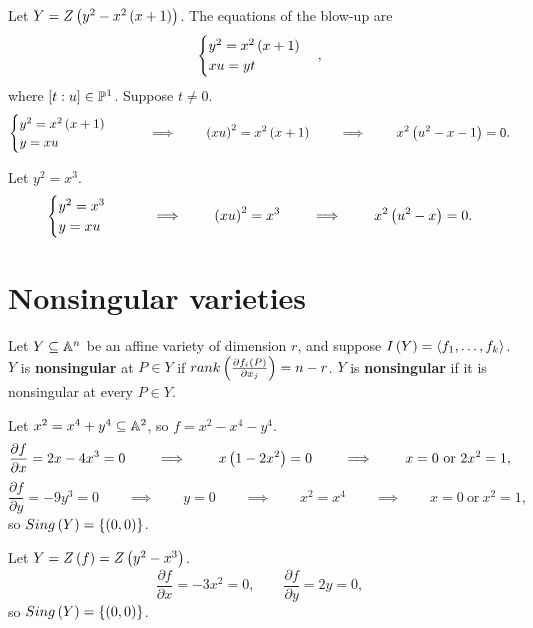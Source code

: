 \begin{example}
Let $ Y = Z\rb{y^2 - x^2\rb{x + 1}} $. The equations of the blow-up are
$$
\begin{cases}
y^2 = x^2\rb{x + 1} \\
xu = yt
\end{cases},
$$
where $ \sb{t : u} \in \P^1 $. Suppose $ t \ne 0 $.
$$
\begin{cases}
y^2 = x^2\rb{x + 1} \\
y = xu
\end{cases}
\qquad \implies \qquad \rb{xu}^2 = x^2\rb{x + 1} \qquad \implies \qquad x^2\rb{u^2 - x - 1} = 0.
$$
\end{example}

\begin{example}
Let $ y^2 = x^3 $.
$$
\begin{cases}
y^2 = x^3 \\
y = xu
\end{cases}
\qquad \implies \qquad \rb{xu}^2 = x^3 \qquad \implies \qquad x^2\rb{u^2 - x} = 0.
$$
\end{example}

\pagebreak

\section{Nonsingular varieties}


\begin{definition}
Let $ Y \subseteq \A^n $ be an affine variety of dimension $ r $, and suppose $ I\rb{Y} = \ab{f_1, \dots, f_k} $. $ Y $ is \textbf{nonsingular} at $ P \in Y $ if $ rank\rb{\tfrac{\partial f_i\rb{P}}{\partial x_j}} = n - r $. $ Y $ is \textbf{nonsingular} if it is nonsingular at every $ P \in Y $.
\end{definition}

\begin{example}
Let $ x^2 = x^4 + y^4 \subseteq \A^2 $, so $ f = x^2 - x^4 - y^4 $.
$$ \dfrac{\partial f}{\partial x} = 2x - 4x^3 = 0 \qquad \implies \qquad x\rb{1 - 2x^2} = 0 \qquad \implies \qquad x = 0 \ \text{or} \ 2x^2 = 1, $$
$$ \dfrac{\partial f}{\partial y} = -9y^3 = 0 \qquad \implies \qquad y = 0 \qquad \implies \qquad x^2 = x^4 \qquad \implies \qquad x = 0 \ \text{or} \ x^2 = 1, $$
so $ Sing\rb{Y} = \cb{\rb{0, 0}} $.
\end{example}

\begin{example}
Let $ Y = Z\rb{f} = Z\rb{y^2 - x^3} $.
$$ \dfrac{\partial f}{\partial x} = -3x^2 = 0, \qquad \dfrac{\partial f}{\partial y} = 2y = 0, $$
so $ Sing\rb{Y} = \cb{\rb{0, 0}} $.
\end{example}

